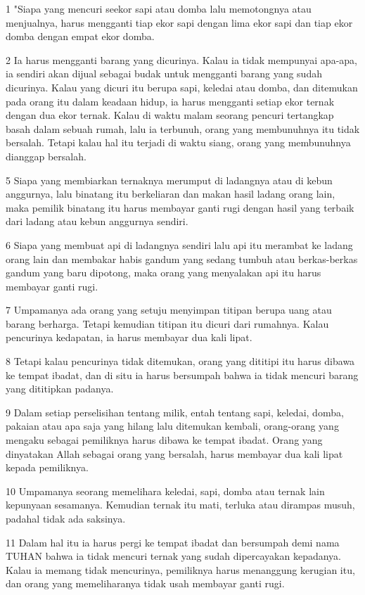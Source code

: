 \par 1 "Siapa yang mencuri seekor sapi atau domba lalu memotongnya atau menjualnya, harus mengganti tiap ekor sapi dengan lima ekor sapi dan tiap ekor domba dengan empat ekor domba.
\par 2 Ia harus mengganti barang yang dicurinya. Kalau ia tidak mempunyai apa-apa, ia sendiri akan dijual sebagai budak untuk mengganti barang yang sudah dicurinya. Kalau yang dicuri itu berupa sapi, keledai atau domba, dan ditemukan pada orang itu dalam keadaan hidup, ia harus mengganti setiap ekor ternak dengan dua ekor ternak. Kalau di waktu malam seorang pencuri tertangkap basah dalam sebuah rumah, lalu ia terbunuh, orang yang membunuhnya itu tidak bersalah. Tetapi kalau hal itu terjadi di waktu siang, orang yang membunuhnya dianggap bersalah.
\par 5 Siapa yang membiarkan ternaknya merumput di ladangnya atau di kebun anggurnya, lalu binatang itu berkeliaran dan makan hasil ladang orang lain, maka pemilik binatang itu harus membayar ganti rugi dengan hasil yang terbaik dari ladang atau kebun anggurnya sendiri.
\par 6 Siapa yang membuat api di ladangnya sendiri lalu api itu merambat ke ladang orang lain dan membakar habis gandum yang sedang tumbuh atau berkas-berkas gandum yang baru dipotong, maka orang yang menyalakan api itu harus membayar ganti rugi.
\par 7 Umpamanya ada orang yang setuju menyimpan titipan berupa uang atau barang berharga. Tetapi kemudian titipan itu dicuri dari rumahnya. Kalau pencurinya kedapatan, ia harus membayar dua kali lipat.
\par 8 Tetapi kalau pencurinya tidak ditemukan, orang yang dititipi itu harus dibawa ke tempat ibadat, dan di situ ia harus bersumpah bahwa ia tidak mencuri barang yang dititipkan padanya.
\par 9 Dalam setiap perselisihan tentang milik, entah tentang sapi, keledai, domba, pakaian atau apa saja yang hilang lalu ditemukan kembali, orang-orang yang mengaku sebagai pemiliknya harus dibawa ke tempat ibadat. Orang yang dinyatakan Allah sebagai orang yang bersalah, harus membayar dua kali lipat kepada pemiliknya.
\par 10 Umpamanya seorang memelihara keledai, sapi, domba atau ternak lain kepunyaan sesamanya. Kemudian ternak itu mati, terluka atau dirampas musuh, padahal tidak ada saksinya.
\par 11 Dalam hal itu ia harus pergi ke tempat ibadat dan bersumpah demi nama TUHAN bahwa ia tidak mencuri ternak yang sudah dipercayakan kepadanya. Kalau ia memang tidak mencurinya, pemiliknya harus menanggung kerugian itu, dan orang yang memeliharanya tidak usah membayar ganti rugi.
